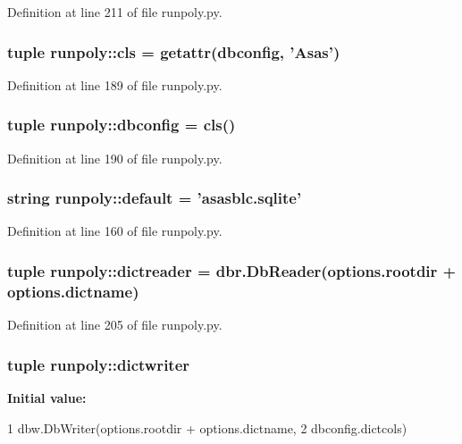 Definition at line 211 of file runpoly.py.

\hypertarget{namespacerunpoly_ae53c9938e3373cc687af5896e211fcc4}{
\subsubsection[{cls}]{\setlength{\rightskip}{0pt plus 5cm}tuple {\bf runpoly::cls} = getattr({\bf dbconfig}, 'Asas')}}
\label{namespacerunpoly_ae53c9938e3373cc687af5896e211fcc4}


Definition at line 189 of file runpoly.py.

\hypertarget{namespacerunpoly_a23238d44f53fedb2335ddfd9e0ba563a}{
\subsubsection[{dbconfig}]{\setlength{\rightskip}{0pt plus 5cm}tuple {\bf runpoly::dbconfig} = {\bf cls}()}}
\label{namespacerunpoly_a23238d44f53fedb2335ddfd9e0ba563a}


Definition at line 190 of file runpoly.py.

\hypertarget{namespacerunpoly_afb3be1048713b880f7ac5b701514765d}{
\subsubsection[{default}]{\setlength{\rightskip}{0pt plus 5cm}string {\bf runpoly::default} = 'asasblc.sqlite'}}
\label{namespacerunpoly_afb3be1048713b880f7ac5b701514765d}


Definition at line 160 of file runpoly.py.

\hypertarget{namespacerunpoly_a41be213241b93ac1aaaf0a0dcd1818f2}{
\subsubsection[{dictreader}]{\setlength{\rightskip}{0pt plus 5cm}tuple {\bf runpoly::dictreader} = dbr.DbReader(options.rootdir + options.dictname)}}
\label{namespacerunpoly_a41be213241b93ac1aaaf0a0dcd1818f2}


Definition at line 205 of file runpoly.py.

\hypertarget{namespacerunpoly_a09493fdc135109309376e8ac388a3fde}{
\subsubsection[{dictwriter}]{\setlength{\rightskip}{0pt plus 5cm}tuple {\bf runpoly::dictwriter}}}
\label{namespacerunpoly_a09493fdc135109309376e8ac388a3fde}
{\bfseries Initial value:}
\begin{DoxyCode}
1 dbw.DbWriter(options.rootdir + options.dictname, 
2                               dbconfig.dictcols)
\end{DoxyCode}


